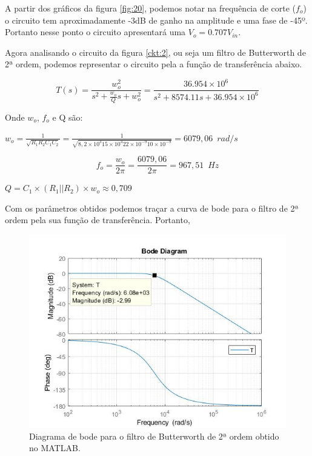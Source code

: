 A partir dos gráficos da figura \ref{fig:20}, podemos notar na frequência de corte ($f_o$) o circuito tem aproximadamente -3dB de ganho na amplitude e uma fase de -45º. Portanto nesse ponto o circuito apresentará uma $V_o = 0.707V_{in}$.

Agora analisando o circuito da figura \ref{ckt:2}, ou seja um filtro de Butterworth de 2ª ordem, podemos representar o circuito pela a função de transferência abaixo.

\begin{equation} \label{Ts2}
    T(s) = \frac{w_o^2}{s^2+ \frac{w_o}{Q}s + w_o^2} = \frac{36.954\times10^6}{s^2+ 8574.11s + 36.954\times10^6}
\end{equation}

Onde $w_o$, $f_o$ e Q são:

\begin{center}
    $w_o = \frac{1}{\sqrt{R_1 R_2 C_1 C_2}} = \frac{1}{\sqrt{8,2 \times 10^3 15 \times 10^3 22 \times 10^{-9} 10 \times 10^{-9}}} = 6079, 06 \hspace{6pt} rad/s$
\end{center}




\begin{equation} \label{r}
    f_o = \frac{w_o}{2\pi} =  \frac{6079,06}{2\pi} = 967,51 \hspace{6pt} Hz
\end{equation}

\begin{center}
    $Q = C_1 \times (R_1 || R_2) \times w_o \approx 0,709$
\end{center}

Com os parâmetros obtidos podemos traçar a curva de bode para o filtro de 2ª ordem pela sua função de transferência. Portanto,

\begin{figure}[H] 
\centering
\includegraphics[width=12cm]{images/bode2ordem.jpg}
\caption{Diagrama de bode para o filtro de Butterworth de 2ª ordem obtido no MATLAB.}
\label{fig:4} 
\end{figure}



